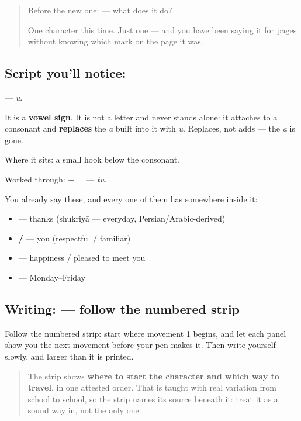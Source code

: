 \label{lesson:HI-S120-vowel-sign-u}



\begin{quote}
Before the new one:  — what does it do?

One character this time. Just one — and you have been saying it for pages without knowing which mark on the page it was.
\end{quote}

\subsection*{Script you'll notice: }
\textbf{} — \emph{u}.

It is a \textbf{vowel sign}. It is not a letter and never stands alone: it attaches to a consonant and \textbf{replaces} the \emph{a} built into it with \emph{u}. Replaces, not adds — the \emph{a} is gone.

Where it sits: a small hook below the consonant.

Worked through: \textbf{} + \textbf{} = \textbf{} — \emph{tu}.

You already say these, and every one of them has  somewhere inside it:

\begin{itemize}
\raggedright
  \item \textbf{} — thanks (shukriyā — everyday, Persian/Arabic-derived)
  \item \textbf{ / } — you (respectful / familiar)
  \item \textbf{} — happiness / pleased to meet you
  \item \textbf{    } — Monday–Friday
\end{itemize}

\subsection*{Writing:  — follow the numbered strip}

Follow the numbered strip: start where movement 1 begins, and let each panel show you the next movement before your pen makes it. Then write  yourself — slowly, and larger than it is printed.

\begin{quote}
The strip shows \textbf{where to start the character and which way to travel}, in one attested order. That is taught with real variation from school to school, so the strip names its source beneath it: treat it as a sound way in, not the only one.
\end{quote}

